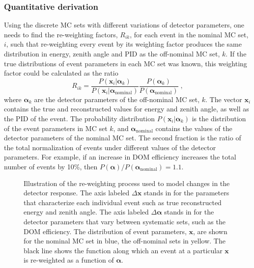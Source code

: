 \subsubsection{Quantitative derivation}
Using the discrete MC sets with different variations of detector parameters, one needs to find the re-weighting factors, $R_{ik}$, for each event in the nominal MC set, $i$, such that re-weighting every event by its weighting factor produces the same distribution in energy, zenith angle and PID as the off-nominal MC set, $k$.
If the true distributions of event parameters in each MC set was known, this weighting factor could be calculated as the ratio
\begin{equation}
    R_{ik} = \frac{P(\boldsymbol{x}_i|\boldsymbol{\alpha}_k)}{P(\boldsymbol{x}_i|\boldsymbol{\alpha}_\mathrm{nominal})} \frac{P(\boldsymbol{\alpha}_k)}{P(\boldsymbol{\alpha}_\mathrm{nominal})}\;, \label{eq:ratio-likelihood}
\end{equation}
where $\boldsymbol{\alpha}_k$ are the detector parameters of the off-nominal MC set, $k$.
The vector $\boldsymbol{x}_i$ contains the true and reconstructed values for energy and zenith angle, as well as the PID of the event.
 The probability distribution $P(\boldsymbol{x}_i|\boldsymbol{\alpha}_k)$ is the distribution of the event parameters in MC set $k$, and $\boldsymbol{\alpha}_\mathrm{nominal}$ contains the values of the detector parameters of the nominal MC set.
The second fraction is the ratio of the total normalization of events under different values of the detector parameters.
For example, if an increase in DOM efficiency increases the total number of events by 10\%, then $P(\boldsymbol{\alpha}) / P(\boldsymbol{\alpha}_\mathrm{nominal}) = 1.1$.
\begin{figure}
    \centering
    
    \caption{Illustration of the re-weighting process used to model changes in the detector response. The axis labeled $\Delta \boldsymbol{x}$ stands in for the parameters that characterize each individual event such as true reconstructed energy and zenith angle. The axis labeled $\Delta \boldsymbol{\alpha}$ stands in for the detector parameters that vary between systematic sets, such as the DOM efficiency. The distribution of event parameters, $\boldsymbol{x}$, are shown for the nominal MC set in blue, the off-nominal sets in yellow. The black line shows the function along which an event at a particular $\boldsymbol{x}$ is re-weighted as a function of $\boldsymbol{\alpha}$.\label{fig:ultrasurface-illustration}}
\end{figure}
